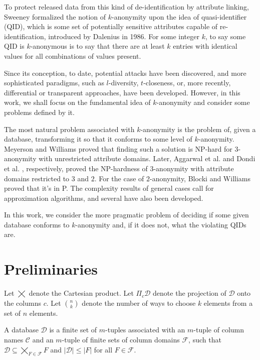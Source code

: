 \documentclass[12pt]{llncs}
\newcommand{\cC}{\mathcal{C}}
\newcommand{\cD}{\mathcal{D}}
\newcommand{\cF}{\mathcal{F}}
\newcommand{\Proj}[1]{\Pi_{#1}}
\begin{document}
To protect released data from this kind of de-identification by attribute linking, Sweeney formalized the notion of $k$-anonymity upon the idea of quasi-identifier (QID), which is some set of potentially sensitive attributes capable of re-identification, introduced by Dalenius \cite{Dalenius:1986} in 1986. For some integer $k$, to say some QID is $k$-anonymous is to say that there are at least $k$ entries with identical values for all combinations of values present.

Since its conception, to date, potential attacks have been discovered, and more sophisticated paradigms, such as $l$-diversity, $t$-closeness, or, more recently, differential or transparent approaches, have been developed. However, in this work, we shall focus on the fundamental idea of $k$-anonymity and consider some problems defined by it.

The most natural problem associated with $k$-anonymity is the problem of, given a database, transforming it so that it conforms to some level of $k$-anonymity. Meyerson and Williams \cite{Meyerson:2004} proved that finding such a solution is NP-hard for $3$-anonymity with unrestricted attribute domains. Later, Aggarwal et al. \cite{Aggarwal:2005} and Dondi et al. \cite{Dondi:2009}, respectively, proved the NP-hardness of $3$-anonymity with attribute domains restricted to $3$ and $2$. For the case of $2$-anonymity, Blocki and Williams \cite{Blocki:2010} proved that it's in P. The complexity results of general cases call for approximation algorithms, and several have also been developed.

In this work, we consider the more pragmatic problem of deciding if some given database conforms to $k$-anonymity and, if it does not, what the violating QIDs are.

\section{Preliminaries}

Let $\bigtimes$ denote the Cartesian product. Let $\Proj{c} \cD$ denote the projection of $\cD$ onto the columns $c$. Let $\binom{n}{k}$ denote the number of ways to choose $k$ elements from a set of $n$ elements.

\begin{definition}
A database $\cD$ is a finite set of $m$-tuples associated with an $m$-tuple of column names $\cC$ and an $m$-tuple of finite sets of column domains $\cF$, such that $\cD \subseteq \bigtimes_{F \in \cF} F$ and $|\cD| \leq |F|$ for all $F \in \cF$.
\end{definition}
\end{document}
